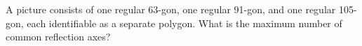 A picture consists of one regular 63-gon, one regular 91-gon, and one regular 105-gon, each identifiable as a separate polygon. What is the maximum number of common reflection axes?
